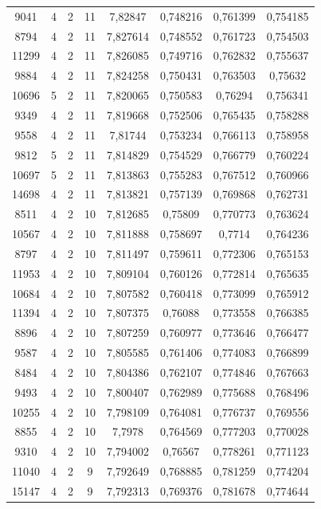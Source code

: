 \begin{longtable}{|c|c|c|c|c|c|c|c|}
9041 & 4 & 2 & 11 & 7,82847 & 0,748216 & 0,761399 & 0,754185 \\
8794 & 4 & 2 & 11 & 7,827614 & 0,748552 & 0,761723 & 0,754503 \\
11299 & 4 & 2 & 11 & 7,826085 & 0,749716 & 0,762832 & 0,755637 \\
9884 & 4 & 2 & 11 & 7,824258 & 0,750431 & 0,763503 & 0,75632 \\
10696 & 5 & 2 & 11 & 7,820065 & 0,750583 & 0,76294 & 0,756341 \\
9349 & 4 & 2 & 11 & 7,819668 & 0,752506 & 0,765435 & 0,758288 \\
9558 & 4 & 2 & 11 & 7,81744 & 0,753234 & 0,766113 & 0,758958 \\
9812 & 5 & 2 & 11 & 7,814829 & 0,754529 & 0,766779 & 0,760224 \\
10697 & 5 & 2 & 11 & 7,813863 & 0,755283 & 0,767512 & 0,760966 \\
14698 & 4 & 2 & 11 & 7,813821 & 0,757139 & 0,769868 & 0,762731 \\
8511 & 4 & 2 & 10 & 7,812685 & 0,75809 & 0,770773 & 0,763624 \\
10567 & 4 & 2 & 10 & 7,811888 & 0,758697 & 0,7714 & 0,764236 \\
8797 & 4 & 2 & 10 & 7,811497 & 0,759611 & 0,772306 & 0,765153 \\
11953 & 4 & 2 & 10 & 7,809104 & 0,760126 & 0,772814 & 0,765635 \\
10684 & 4 & 2 & 10 & 7,807582 & 0,760418 & 0,773099 & 0,765912 \\
11394 & 4 & 2 & 10 & 7,807375 & 0,76088 & 0,773558 & 0,766385 \\
8896 & 4 & 2 & 10 & 7,807259 & 0,760977 & 0,773646 & 0,766477 \\
9587 & 4 & 2 & 10 & 7,805585 & 0,761406 & 0,774083 & 0,766899 \\
8484 & 4 & 2 & 10 & 7,804386 & 0,762107 & 0,774846 & 0,767663 \\
9493 & 4 & 2 & 10 & 7,800407 & 0,762989 & 0,775688 & 0,768496 \\
10255 & 4 & 2 & 10 & 7,798109 & 0,764081 & 0,776737 & 0,769556 \\
8855 & 4 & 2 & 10 & 7,7978 & 0,764569 & 0,777203 & 0,770028 \\
9310 & 4 & 2 & 10 & 7,794002 & 0,76567 & 0,778261 & 0,771123 \\
11040 & 4 & 2 & 9 & 7,792649 & 0,768885 & 0,781259 & 0,774204 \\
15147 & 4 & 2 & 9 & 7,792313 & 0,769376 & 0,781678 & 0,774644 \\

\end{longtable}
